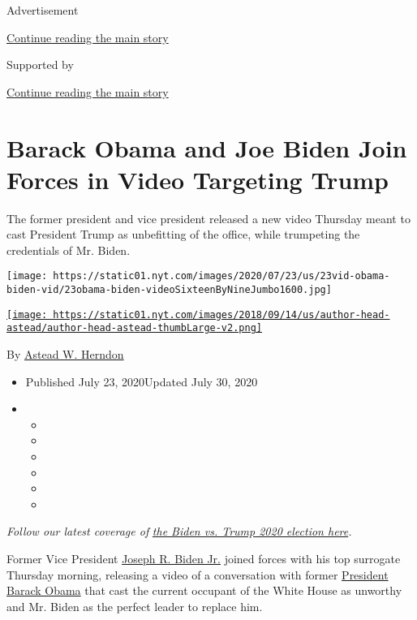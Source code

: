 Advertisement

\protect\hyperlink{after-top}{Continue reading the main story}

Supported by

\protect\hyperlink{after-sponsor}{Continue reading the main story}

\hypertarget{barack-obama-and-joe-biden-join-forces-in-video-targeting-trump}{%
\section{Barack Obama and Joe Biden Join Forces in Video Targeting
Trump}\label{barack-obama-and-joe-biden-join-forces-in-video-targeting-trump}}

The former president and vice president released a new video Thursday
meant to cast President Trump as unbefitting of the office, while
trumpeting the credentials of Mr. Biden.

\texttt{[image: https://static01.nyt.com/images/2020/07/23/us/23vid-obama-biden-vid/23obama-biden-videoSixteenByNineJumbo1600.jpg]}

\href{https://www.nytimes.com/by/astead-w-herndon}{\texttt{[image: https://static01.nyt.com/images/2018/09/14/us/author-head-astead/author-head-astead-thumbLarge-v2.png]}}

By \href{https://www.nytimes.com/by/astead-w-herndon}{Astead W. Herndon}

\begin{itemize}
\item
  Published July 23, 2020Updated July 30, 2020
\item
  \begin{itemize}
  \item
  \item
  \item
  \item
  \item
  \item
  \end{itemize}
\end{itemize}

\emph{Follow our latest coverage of}
\href{https://www.nytimes.com/2020/07/31/us/elections/biden-vs-trump.html}{\emph{the
Biden vs. Trump 2020 election here}}\emph{.}

Former Vice President
\href{https://www.nytimes.com/interactive/2020/us/elections/joe-biden.html}{Joseph
R. Biden Jr.} joined forces with his top surrogate Thursday morning,
releasing a video of a conversation with former
\href{https://www.nytimes.com/2020/07/30/us/politics/obama-trump-biden.html}{President
Barack Obama} that cast the current occupant of the White House as
unworthy and Mr. Biden as the perfect leader to replace him.

